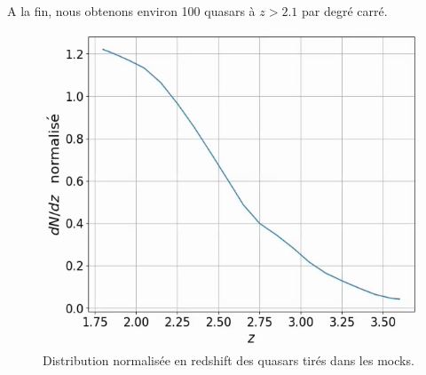 A la fin, nous obtenons environ \num{100} quasars à $z > \num{2.1}$ par degré carré.
\begin{figure}
  \centering
  \includegraphics[scale=0.5]{dndz_qso}
  \caption{Distribution normalisée en redshift des quasars tirés dans les mocks.}
  \label{fig:dndz_qso}
\end{figure}

